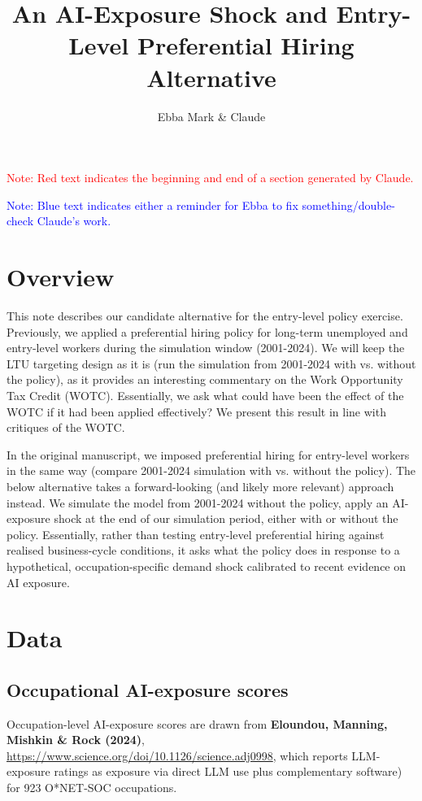 \documentclass{article}
\title{An AI-Exposure Shock and Entry-Level Preferential Hiring Alternative}
\author{Ebba Mark \& Claude}
\date{}
\begin{document}
\maketitle
\doublespacing

\textcolor{red}{Note: Red text indicates the beginning and end of a section generated by Claude.}

\textcolor{blue}{Note: Blue text indicates either a reminder for Ebba to fix something/double-check Claude's work.}

\section{Overview}

This note describes our candidate alternative for the entry-level policy exercise. Previously, we applied a preferential hiring policy for long-term unemployed and entry-level workers during the simulation window (2001-2024). We will keep the LTU targeting design as it is (run the simulation from 2001-2024 with vs. without the policy), as it provides an interesting commentary on the Work Opportunity Tax Credit (WOTC). Essentially, we ask what could have been the effect of the WOTC if it had been applied effectively? We present this result in line with critiques of the WOTC.


In the original manuscript, we imposed preferential hiring for entry-level workers in the same way (compare 2001-2024 simulation with vs. without the policy). The below alternative takes a forward-looking (and likely more relevant) approach instead. We simulate the model from 2001-2024 without the policy, apply an AI-exposure shock at the end of our simulation period, either with or without the policy.
Essentially, rather than testing entry-level preferential hiring against
realised business-cycle conditions, it asks what the policy does in response to a hypothetical,
occupation-specific demand shock calibrated to recent evidence on AI exposure.

\section{Data}

\subsection{Occupational AI-exposure scores}

Occupation-level AI-exposure scores are drawn from \textbf{Eloundou, Manning, Mishkin \& Rock (2024)}, \url{https://www.science.org/doi/10.1126/science.adj0998}, which reports LLM-exposure ratings as exposure via direct LLM use plus complementary software) for 923 O*NET-SOC occupations.
\end{document}
